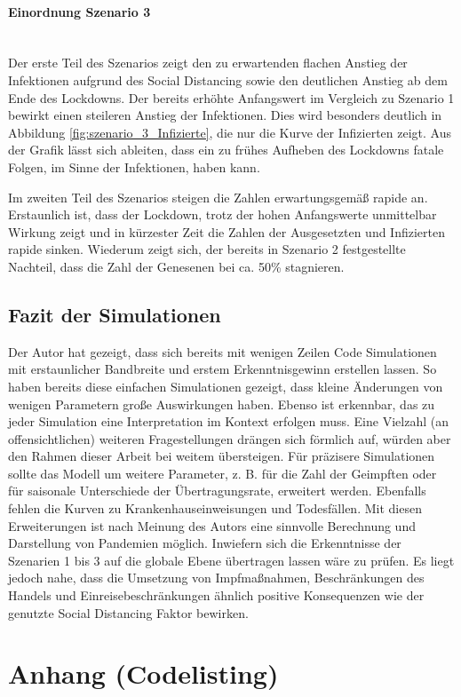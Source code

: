 \documentclass[12pt]{article}
\begin{document}
\paragraph{Einordnung Szenario 3} \mbox{} \\
Der erste Teil des Szenarios zeigt den zu erwartenden flachen Anstieg der Infektionen aufgrund des Social Distancing sowie den deutlichen Anstieg ab dem Ende des Lockdowns. Der bereits erhöhte Anfangswert im Vergleich zu Szenario 1 bewirkt einen steileren Anstieg der Infektionen. Dies wird besonders deutlich in Abbildung \ref{fig:szenario_3_Infizierte}, die nur die Kurve der Infizierten zeigt. Aus der Grafik lässt sich ableiten, dass ein zu frühes Aufheben des Lockdowns fatale Folgen, im Sinne der Infektionen, haben kann.

Im zweiten Teil des Szenarios steigen die Zahlen erwartungsgemäß rapide an. Erstaunlich ist, dass der Lockdown, trotz der hohen Anfangswerte unmittelbar Wirkung zeigt und in kürzester Zeit die Zahlen der Ausgesetzten und Infizierten rapide sinken. Wiederum zeigt sich, der bereits in Szenario 2 festgestellte Nachteil, dass die Zahl der Genesenen bei ca. 50\% stagnieren.

\subsection{Fazit der Simulationen}
Der Autor hat gezeigt, dass sich bereits mit wenigen Zeilen Code Simulationen mit erstaunlicher Bandbreite und erstem Erkenntnisgewinn erstellen lassen. So haben bereits diese einfachen Simulationen gezeigt, dass kleine Änderungen von wenigen Parametern große Auswirkungen haben. Ebenso ist erkennbar, das zu jeder Simulation eine Interpretation im Kontext erfolgen muss. Eine Vielzahl (an offensichtlichen) weiteren Fragestellungen drängen sich förmlich auf, würden aber den Rahmen dieser Arbeit bei weitem übersteigen. Für präzisere Simulationen sollte das Modell um weitere Parameter, z. B. für die Zahl der Geimpften oder für saisonale Unterschiede der Übertragungsrate, erweitert werden. Ebenfalls fehlen die Kurven zu Krankenhauseinweisungen und Todesfällen. Mit diesen Erweiterungen ist nach Meinung des Autors eine sinnvolle Berechnung und Darstellung von Pandemien möglich. Inwiefern sich die Erkenntnisse der Szenarien 1 bis 3 auf die globale Ebene übertragen lassen wäre zu prüfen. Es liegt jedoch nahe, dass die Umsetzung von Impfmaßnahmen, Beschränkungen des Handels und Einreisebeschränkungen ähnlich positive Konsequenzen wie der genutzte Social Distancing Faktor bewirken. 

\newpage
\section{Anhang (Codelisting)} \label{sec:Anhang}

\newpage
\printbibliography
\end{document}
